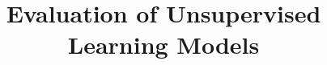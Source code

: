 \title{Evaluation of Unsupervised Learning Models}
\label{chp:evaluation-unsupervised-learning}
\author{}
\institute{}
\maketitle